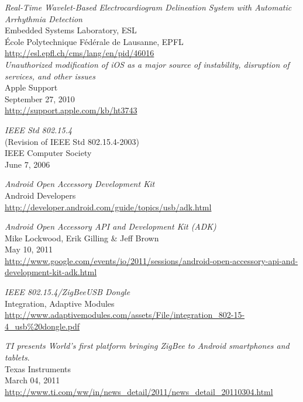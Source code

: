 \begin{thebibliography}{widest-label}

 	\emph{Real-Time Wavelet-Based Electrocardiogram Delineation System with Automatic Arrhythmia Detection}\\
 	Embedded Systems Laboratory, ESL\\
 	École Polytechnique Fédérale de Lausanne, EPFL\\
 	\url{http://esl.epfl.ch/cms/lang/en/pid/46016}\\
	
	\emph{Unauthorized modification of iOS as a major source of instability, disruption of services, and other issues}\\
	Apple Support\\
	September 27, 2010\\
	\url{http://support.apple.com/kb/ht3743}
	
	\emph{IEEE Std 802.15.4}\\
	(Revision of IEEE Std 802.15.4-2003)\\
	IEEE Computer Society\\
	June 7, 2006
	
	\emph{Android Open Accessory Development Kit}\\
	Android Developers\\
	\url{http://developer.android.com/guide/topics/usb/adk.html}
	
	\emph{Android Open Accessory API and Development Kit (ADK)}\\
	Mike Lockwood, Erik Gilling \& Jeff Brown\\
	May 10, 2011\\
	\url{http://www.google.com/events/io/2011/sessions/android-open-accessory-api-and-development-kit-adk.html}
	
	\emph{IEEE 802.15.4/ZigBee\texttrademark USB Dongle}\\
	Integration, Adaptive Modules\\
	\url{http://www.adaptivemodules.com/assets/File/integration_802-15-4_usb\%20dongle.pdf}	

	\emph{TI presents World’s first platform bringing ZigBee to Android smartphones and tablets}.\\
 	Texas Instruments\\
	March 04, 2011\\
 	\url{http://www.ti.com/ww/in/news_detail/2011/news_detail_20110304.html}\\
 	

\end{thebibliography}
